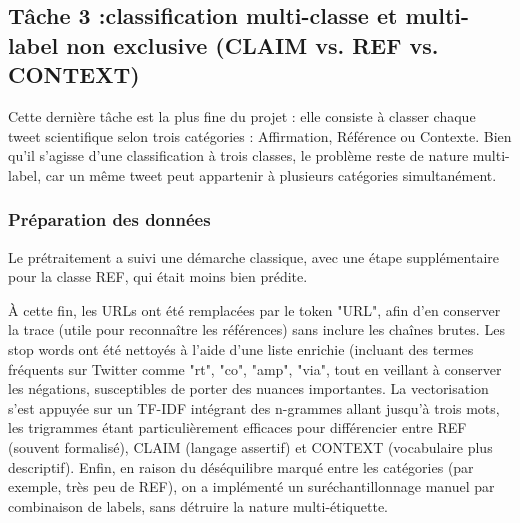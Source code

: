 \subsection{Tâche 3 :classification multi-classe et multi-label non exclusive ({CLAIM} vs. {REF} vs. {CONTEXT})}\label{subsec:modele-3:-claim-vs-ref-vs-contexte}
Cette dernière tâche est la plus fine du projet : elle consiste à classer chaque tweet scientifique selon trois catégories : Affirmation, Référence ou Contexte.
Bien qu’il s’agisse d’une classification à trois classes, le problème reste de nature multi-label, car un même tweet peut appartenir à plusieurs catégories simultanément.

\subsubsection{Préparation des données}
Le prétraitement a suivi une démarche classique, avec une étape supplémentaire pour la classe REF, qui était moins bien prédite.

\noindent À cette fin, les URLs ont été remplacées par le token "URL", afin d’en conserver la trace (utile pour reconnaître les références) sans inclure les chaînes brutes.
Les stop words ont été nettoyés à l’aide d’une liste enrichie (incluant des termes fréquents sur Twitter comme "rt", "co", "amp", "via", tout en veillant à conserver les négations, susceptibles de porter des nuances importantes.
La vectorisation s’est appuyée sur un TF-IDF intégrant des n-grammes allant jusqu’à trois mots, les trigrammes étant particulièrement efficaces pour différencier entre REF (souvent formalisé), CLAIM (langage 	assertif) et CONTEXT (vocabulaire plus descriptif).
Enfin, en raison du déséquilibre marqué entre les catégories (par exemple, très peu de REF), on a implémenté un suréchantillonnage manuel par combinaison de labels, sans détruire la nature multi-étiquette.


